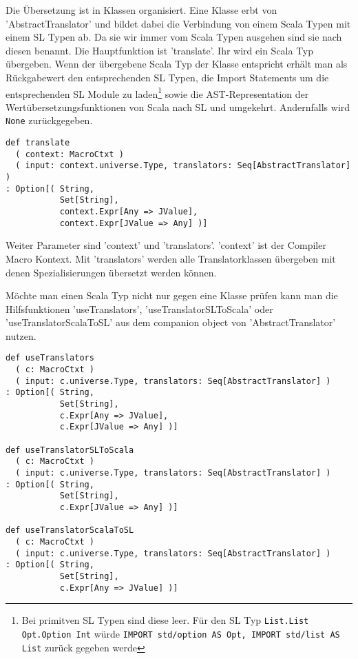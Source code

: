 \documentclass[12pt]{scrreprt}
\begin{document}
Die Übersetzung ist in Klassen organisiert. Eine Klasse erbt von 'AbstractTranslator' und bildet dabei die Verbindung von einem Scala Typen mit einem \ac{SL} Typen ab. Da sie wir immer vom Scala Typen ausgehen sind sie nach diesen benannt. Die Hauptfunktion ist 'translate'. Ihr wird ein Scala Typ übergeben. Wenn der übergebene Scala Typ der Klasse entspricht erhält man als Rückgabewert den entsprechenden \ac{SL} Typen, die Import Statements um die entsprechenden \ac{SL} Module zu laden\footnote{Bei primitven \ac{SL} Typen sind diese leer. Für den \ac{SL} Typ \lstinline!List.List Opt.Option Int! würde \lstinline!IMPORT std/option AS Opt, IMPORT std/list AS List! zurück gegeben werde} sowie die \ac{AST}-Representation der Wertübersetzungsfunktionen von Scala nach \ac{SL} und umgekehrt. Andernfalls wird \lstinline!None! zurückgegeben.

\begin{lstlisting}[caption=Hauptfunktion in AbstractTranslator, label=lst:bsp2]
def translate
  ( context: MacroCtxt )
  ( input: context.universe.Type, translators: Seq[AbstractTranslator] )
: Option[( String, 
           Set[String], 
           context.Expr[Any => JValue], 
           context.Expr[JValue => Any] )]
\end{lstlisting}

Weiter Parameter sind 'context' und 'translators'. 'context' ist der Compiler Macro Kontext. Mit 'translators' werden alle Translatorklassen übergeben mit denen Spezialisierungen übersetzt werden können.

Möchte man einen Scala Typ nicht nur gegen eine Klasse prüfen kann man die Hilfsfunktionen 'useTranslators', 'useTranslatorSLToScala' oder 'useTranslatorScalaToSL' aus dem companion object von 'AbstractTranslator' nutzen.


\begin{lstlisting}[caption=Hilfsfunktionen, label=lst:hilfsfunktionen]
def useTranslators
  ( c: MacroCtxt )
  ( input: c.universe.Type, translators: Seq[AbstractTranslator] )
: Option[( String,
           Set[String], 
           c.Expr[Any => JValue], 
           c.Expr[JValue => Any] )]

def useTranslatorSLToScala
  ( c: MacroCtxt )
  ( input: c.universe.Type, translators: Seq[AbstractTranslator] )
: Option[( String, 
           Set[String], 
           c.Expr[JValue => Any] )]

def useTranslatorScalaToSL
  ( c: MacroCtxt )
  ( input: c.universe.Type, translators: Seq[AbstractTranslator] )
: Option[( String, 
           Set[String], 
           c.Expr[Any => JValue] )]
\end{lstlisting}
\end{document}
